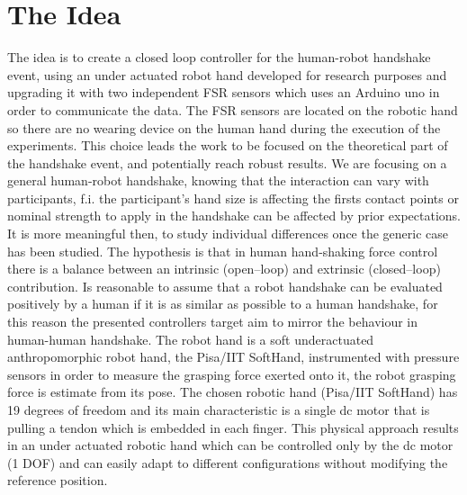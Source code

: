 \chapter{The Idea}
The idea is to create a closed loop controller for the human-robot handshake event, using an under actuated robot hand developed for research purposes and upgrading it with two independent FSR sensors which uses an Arduino uno in order to communicate the data.
The FSR sensors are located on the robotic hand so there are no wearing device on the human hand during the execution of the experiments.
This choice leads the work to be focused on the theoretical part of the handshake event, and potentially reach robust results. We are focusing on a general human-robot handshake, knowing that the interaction can vary with participants, f.i. the participant's hand size is affecting the firsts contact points or nominal strength to apply in the handshake can be affected by prior expectations. It is more meaningful then, to study individual differences once the generic case has been studied.
The hypothesis is that in human hand-shaking force control there is a balance between an intrinsic (open–loop) and extrinsic (closed–loop) contribution.
Is reasonable to assume that a robot handshake can be evaluated positively by a human if it is as similar as possible to a human handshake, for this reason the presented controllers target aim to mirror the behaviour in human-human handshake.
The robot hand is a soft underactuated anthropomorphic robot hand, the Pisa/IIT SoftHand, instrumented with pressure sensors in order to measure the grasping force exerted onto it, the robot grasping force is estimate from its pose.
The chosen robotic hand (Pisa/IIT SoftHand) has 19 degrees of freedom and its main characteristic is a single dc motor that is pulling a tendon which is embedded in each finger. This physical approach results in an under actuated robotic hand which can be controlled only by the dc motor (1 DOF) and can easily adapt to different configurations without modifying the reference position. 